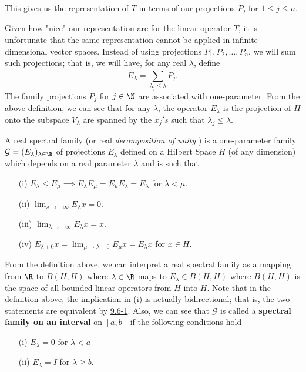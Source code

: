This gives us the representation of \( T  \) in terms of our projections \( {P}_{j} \) for \( 1 \leq j \leq n  \). 

Given how "nice" our representation are for the linear operator \( T  \), it is unfortunate that the same representation cannot be applied in infinite dimensional vector spaces. Instead of using projections \( {P}_{1}, {P}_{2} ,\dots , {P}_{n} \), we will sum such projections; that is, we will have, for any real \( \lambda  \), define 
\[  {E}_{\lambda} = \sum_{ {\lambda}_{j} \leq \lambda  }^{  } {P}_{j}. \tag{5} \]
The family projections \( {P}_{j}  \) for \( j \in \N  \) are associated with one-parameter. From the above definition, we can see that for any \( \lambda  \), the operator \( {E}_{\lambda} \) is the projection of \( H  \) onto the subspace \( {V}_{\lambda} \) are spanned by the \( {x}_{j}'s \) such that \( {\lambda}_{j} \leq \lambda  \).   

\begin{definition}\label{9.7-1}
    A real spectral family (or real \textit{decomposition of unity} ) is a one-parameter family \( \mathcal{G} = ({E}_{\lambda})_{\lambda \in \R } \) of projections \( {E}_{\lambda}  \) defined on a Hilbert Space \( H  \) (of any dimension) which depends on a real parameter \( \lambda \) and is such that  
    \begin{enumerate}
        \item[(i)] \( {E}_{\lambda} \leq {E}_{\mu} \implies  {E}_{\lambda} {E}_{\mu} = {E}_{\mu} {E}_{\lambda} = {E}_{\lambda}  \) for \( \lambda < \mu \). 
        \item[(ii)] \( \lim_{ \lambda  \to - \infty   }  {E}_{\lambda} x = 0 \).
        \item[(iii)] \( \lim_{ \lambda  \to  + \infty   }  {E}_{\lambda}x = x  \).
        \item[(iv)] \( {E}_{\lambda + 0}x = \lim_{ \mu \to \lambda + 0  }  {E}_{\mu} x = {E}_{\lambda}x  \) for \( x \in H  \).
    \end{enumerate}
\end{definition}

From the definition above, we can interpret a real spectral family as a mapping from \( \R  \) to \( B(H,H) \) where \( \lambda \in \R  \) maps to \( {E}_{\lambda} \in B(H,H) \) where \( B(H,H) \) is the space of all bounded linear operators from \( H  \) into \( H  \). Note that in the definition above, the implication in (i) is actually bidirectional; that is, the two statements are equivalent by {\hyperref[9.6-1]{9.6-1}}. Also, we can see that \( \mathcal{G} \) is called a \textbf{spectral family on an interval} on \( [a,b] \) if the following conditions hold
\begin{enumerate}
    \item[(i)] \( {E}_{\lambda} = 0  \) for \( \lambda < a  \) 
    \item[(ii)] \( {E}_{\lambda} = I  \) for \( \lambda \geq b  \).
\end{enumerate}

